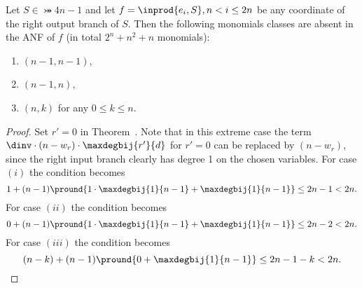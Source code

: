 \begin{corollary}
Let $S \in \bij{4}{n-1}$ and let $f = \inprod{e_i, S}, n < i \le 2n$ be any coordinate of the right output branch of $S$. Then the following monomials classes are absent in the ANF of $f$ (in total $2^n+n^2+n$ monomials):
{
\enumroman{}
\begin{enumerate}
    \item $(n-1,n-1)$,
    \item $(n-1,n)$,
    \item $(n,k)$ for any $0 \le k \le n$.
\end{enumerate}
}
\end{corollary}
\begin{proof}
Set $r' = 0$ in Theorem~. Note that in this extreme case the term $\dinv \cdot (n - w_r)\cdot\maxdegbij{r'}{d}$ for $r'=0$ can be replaced by $(n - w_r)$, since the right input branch clearly has degree 1 on the chosen variables. For case $(i)$ the condition becomes
$$ 1 + (n-1) \pround{
1\cdot\maxdegbij{1}{n-1} +
\maxdegbij{1}{n-1}
} \le 2n-1 < 2n.$$
For case $(ii)$ the condition becomes
$$ 0 + (n-1) \pround{
1\cdot\maxdegbij{1}{n-1} + \maxdegbij{1}{n-1}
} \le 2n-2 < 2n.$$
For case $(iii)$ the condition becomes
$$ (n-k) + (n-1) \pround{
0 + \maxdegbij{1}{n-1}
} \le 2n-1-k < 2n.$$
\end{proof}